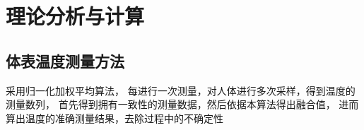 \documentclass[scheme=chinese,a4paper]{article}
\begin{document}





\section{理论分析与计算}

\subsection{体表温度测量方法}
采用归一化加权平均算法，
每进行一次测量，对人体进行多次采样，得到温度的测量数列，
首先得到拥有一致性的测量数据，然后依据本算法得出融合值，
进而算出温度的准确测量结果，去除过程中的不确定性

\end{document}
